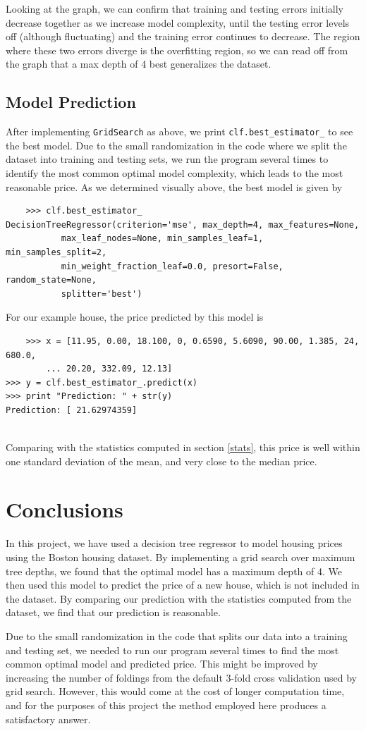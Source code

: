 \documentclass[12 pt]{article}
\numberwithin{equation}{section}
\begin{document}
Looking at the graph, we can confirm that training and testing errors initially decrease together as we increase model complexity, until the testing error levels off (although fluctuating) and the training error continues to decrease. The region where these two errors diverge is the overfitting region, so we can read off from the graph that a max depth of 4 best generalizes the dataset.

\newpage

\subsection{Model Prediction}
After implementing \texttt{GridSearch} as above, we print \texttt{clf.best\_estimator\_} to see the best model. Due to the small randomization in the code where we split the dataset into training and testing sets, we run the program several times to identify the most common optimal model complexity, which leads to the most reasonable price. As we determined visually above, the best model is given by 

\begin{verbatim}
	>>> clf.best_estimator_
DecisionTreeRegressor(criterion='mse', max_depth=4, max_features=None,
           max_leaf_nodes=None, min_samples_leaf=1, min_samples_split=2,
           min_weight_fraction_leaf=0.0, presort=False, random_state=None,
           splitter='best')
\end{verbatim}
For our example house, the price predicted by this model is 
\begin{verbatim}
	>>> x = [11.95, 0.00, 18.100, 0, 0.6590, 5.6090, 90.00, 1.385, 24, 680.0,
	    ... 20.20, 332.09, 12.13]	
>>> y = clf.best_estimator_.predict(x)
>>> print "Prediction: " + str(y)
Prediction: [ 21.62974359]
    
\end{verbatim}
Comparing with the statistics computed in section \ref{stats}, this price is well within one standard deviation of the mean, and very close to the median price.

\section{Conclusions}\label{conclusions}
In this project, we have used a decision tree regressor to model housing prices using the Boston housing dataset. By implementing a grid search over maximum tree depths, we found that the optimal model has a maximum depth of 4. We then used this model to predict the price of a new house, which is not included in the dataset. By comparing our prediction with the statistics computed from the dataset, we find that our prediction is reasonable.

Due to the small randomization in the code that splits our data into a training and testing set, we needed to run our program several times to find the most common optimal model and predicted price. This might be improved by increasing the number of foldings from the default 3-fold cross validation used by grid search. However, this would come at the cost of longer computation time, and for the purposes of this project the method employed here produces a satisfactory answer.
\end{document}
